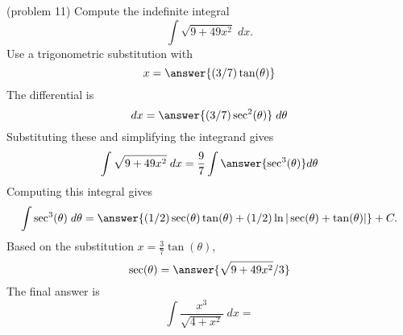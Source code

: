 \documentclass{ximera}
\begin{document}
\begin{problem}(problem 11)
Compute the indefinite integral
\[
\int \sqrt{9 + 49x^2} \; dx.
\]
Use a trigonometric substitution with\\
\[
x = \answer{(3/7)\tan(\theta)}
\]
The differential is\\
\[
dx = \answer{(3/7)\sec^2(\theta)} \; d\theta
\]
Substituting these and simplifying the integrand gives\\
\[
\int \sqrt{9 + 49x^2} \; dx = \frac97 \int \answer{\sec^3(\theta)} d\theta
\]
Computing this integral gives
\[
\int \sec^3(\theta) \; d\theta = \answer{(1/2)\sec(\theta) \tan(\theta) + (1/2)\ln|\sec(\theta)+\tan(\theta)|} + C.
\]
Based on the substitution $x = \frac37 \tan(\theta)$, \\
\[
\sec(\theta) = \answer{\sqrt{9+49x^2}/3}
\]
The final answer is
\[
\int  \frac{x^3}{\sqrt{4 + x^2}} \; dx = 
\]
\begin{center}
\begin{multipleChoice}
\end{multipleChoice}
\end{center}
\end{problem}











\begin{center}
\begin{foldable}
\end{foldable}
\end{center}
\end{document}
